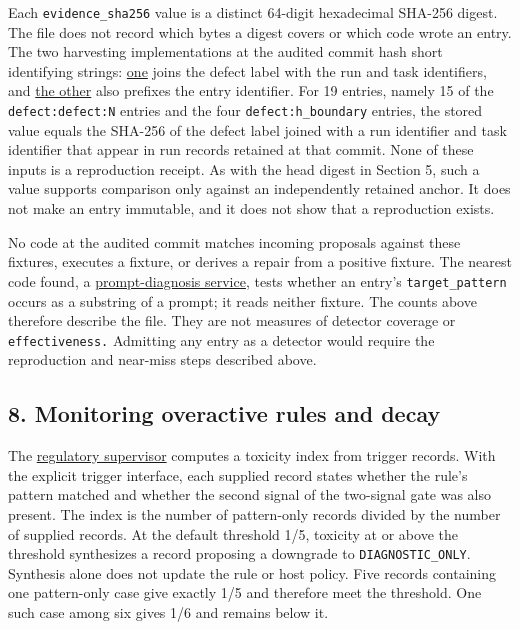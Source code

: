 \documentclass[
  11pt,
]{article}
\begin{document}
Each \nolinkurl{evidence_sha256} value is a distinct 64-digit
hexadecimal SHA-256 digest. The file does not record which bytes a
digest covers or which code wrote an entry. The two harvesting
implementations at the audited commit hash short identifying strings:
\href{https://github.com/dbccpage/the_symbol_game/blob/52cb5457f6c485ba548cfd292f6012a941ed22cf/adversary/domain/immune/seeder.py}{one}
joins the defect label with the run and task identifiers, and
\href{https://github.com/dbccpage/the_symbol_game/blob/52cb5457f6c485ba548cfd292f6012a941ed22cf/operations/domain/symbol_game_bridge/pharmacy_seeder.py}{the
other} also prefixes the entry identifier. For 19 entries, namely 15 of
the \nolinkurl{defect:defect:N} entries and the four
\nolinkurl{defect:h_boundary} entries, the stored value equals the
SHA-256 of the defect label joined with a run identifier and task
identifier that appear in run records retained at that commit. None of
these inputs is a reproduction receipt. As with the head digest in
Section 5, such a value supports comparison only against an
independently retained anchor. It does not make an entry immutable, and
it does not show that a reproduction exists.

No code at the audited commit matches incoming proposals against these
fixtures, executes a fixture, or derives a repair from a positive
fixture. The nearest code found, a
\href{https://github.com/dbccpage/the_symbol_game/blob/52cb5457f6c485ba548cfd292f6012a941ed22cf/external_application/prompt_doctor/use_cases/repair_service.py}{prompt-diagnosis
service}, tests whether an entry's \nolinkurl{target_pattern} occurs as
a substring of a prompt; it reads neither fixture. The counts above
therefore describe the file. They are not measures of detector coverage
or \nolinkurl{effectiveness.} Admitting any entry as a detector would
require the reproduction and near-miss steps described above.

\subsection{8. Monitoring overactive rules and
decay}\label{monitoring-overactive-rules-and-decay}

The
\href{https://github.com/dbccpage/the_symbol_game/blob/52cb5457f6c485ba548cfd292f6012a941ed22cf/pfp/domain/immune/treg.py}{regulatory
supervisor} computes a toxicity index from trigger records. With the
explicit trigger interface, each supplied record states whether the
rule's pattern matched and whether the second signal of the two-signal
gate was also present. The index is the number of pattern-only records
divided by the number of supplied records. At the default threshold 1/5,
toxicity at or above the threshold synthesizes a record proposing a
downgrade to \nolinkurl{DIAGNOSTIC_ONLY}. Synthesis alone does not
update the rule or host policy. Five records containing one pattern-only
case give exactly 1/5 and therefore meet the threshold. One such case
among six gives 1/6 and remains below it.
\end{document}
